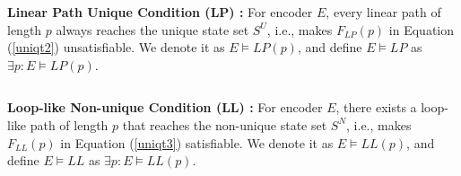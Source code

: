 \documentclass[journal]{IEEEtran}
\begin{document}
\begin{definition11}\label{def_lfuc}%
\textbf{Linear Path Unique Condition ($\boldsymbol{LP}$) :}
For encoder $E$,
every linear path of length $p$ always reaches the unique state set $S^{U}$,
i.e.,
makes $F_{LP}(p)$ in Equation (\ref{uniqt2}) unsatisfiable.
We denote it as $E\vDash LP(p)$,
and define $E\vDash LP$ as $\exists p:E\vDash LP(p)$.



\end{definition11}

\begin{equation}\label{uniqt2}
\end{equation}



\begin{definition11}\label{def_llnc}%
\textbf{Loop-like Non-unique Condition ($\boldsymbol{LL}$) :}
For encoder $E$,
there exists a loop-like path of length $p$ that reaches the non-unique state set $S^{N}$,
i.e.,
makes $F_{LL}(p)$ in Equation (\ref{uniqt3}) satisfiable.
We denote it as $E\vDash LL(p)$,
and define $E\vDash LL$ as $\exists p:E\vDash LL(p)$.



\end{definition11}
\end{document}
